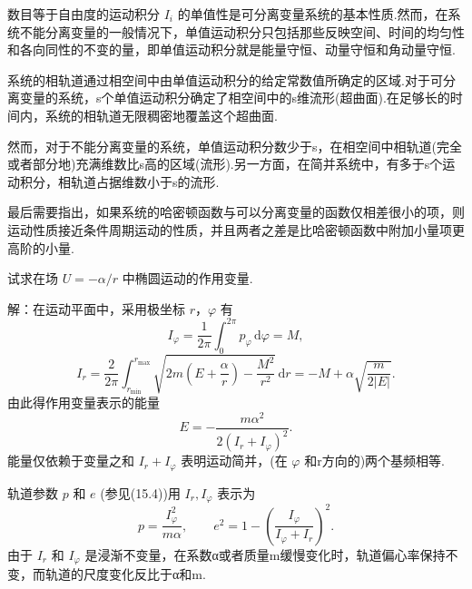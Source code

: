 数目等于自由度的运动积分 $I_i$
的单值性是可分离变量系统的基本性质.然而，在系统不能分离变量的一般情况下，单值运动积分只包括那些反映空间、时间的均匀性和各向同性的不变的量，即单值运动积分就是能量守恒、动量守恒和角动量守恒.

系统的相轨道通过相空间中由单值运动积分的给定常数值所确定的区域.对于可分离变量的系统，s个单值运动积分确定了相空间中的s维流形(超曲面).在足够长的时间内，系统的相轨道无限稠密地覆盖这个超曲面.

然而，对于不能分离变量的系统，单值运动积分数少于s，在相空间中相轨道(完全或者部分地)充满维数比s高的区域(流形).另一方面，在简并系统中，有多于s个运动积分，相轨道占据维数小于s的流形.

最后需要指出，如果系统的哈密顿函数与可以分离变量的函数仅相差很小的项，则运动性质接近条件周期运动的性质，并且两者之差是比哈密顿函数中附加小量项更高阶的小量.

\begin{xiti}

\quad 试求在场 $U=-\alpha/r$
中椭圆运动的作用变量.

解：在运动平面中，采用极坐标 $r$，$\varphi$ 有
\begin{equation*}
  I_\varphi=\frac{1}{2\pi}\int_0^{2\pi}p_\varphi\,\mathrm{d}\varphi=M,
\end{equation*}
\begin{equation*}
  I_r=\frac{2}{2\pi}\int_{r_{\min}}^{r_{\max}}
  \sqrt{2m\left(E+\frac{\alpha}{r}\right)-\frac{M^2}{r^2}}\,\mathrm{d}r
  =-M+\alpha\sqrt{\frac{m}{2|E|}}.
\end{equation*}
由此得作用变量表示的能量
\begin{equation*}
  E=-\frac{m\alpha^2}{2\left(I_r+I_\varphi\right)^2}.
\end{equation*}
能量仅依赖于变量之和 $I_r+I_\varphi$
表明运动简并，(在 $\varphi$ 和r方向的)两个基频相等.

轨道参数 $p$ 和 $e$ (参见(15.4))用 $I_r,I_\varphi$ 表示为
\begin{equation*}
  p=\frac{I_\varphi^2}{m\alpha},\qquad
  e^2=1-\left(\frac{I_\varphi}{I_\varphi+I_r}\right)^2.
\end{equation*}
由于 $I_r$ 和 $I_\varphi$
是浸渐不变量，在系数α或者质量m缓慢变化时，轨道偏心率保持不变，而轨道的尺度变化反比于α和m.

\end{xiti}
